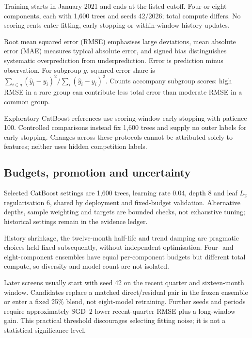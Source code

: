 \documentclass[conference]{IEEEtran}
\begin{document}
\begin{table}[!t]
\caption{Fixed-budget development RMSE (SGD); overlapping windows.}
\label{tab:temporal}\centering\small
\par\smallskip\raggedright\footnotesize Training starts in January 2021 and ends at the listed cutoff. Four or eight components, each with 1,600 trees and seeds 42/2026; total compute differs. No scoring rents enter fitting, early stopping or within-window history updates.
\end{table}

Root mean squared error (RMSE) emphasises large deviations, mean absolute error (MAE) measures typical absolute error, and signed bias distinguishes systematic overprediction from underprediction. Error is prediction minus observation. For subgroup $g$, squared-error share is $\sum_{i\in g}(\widehat y_i-y_i)^2/\sum_i(\widehat y_i-y_i)^2$. Counts accompany subgroup scores: high RMSE in a rare group can contribute less total error than moderate RMSE in a common group.

Exploratory CatBoost references use scoring-window early stopping with patience 100. Controlled comparisons instead fix 1,600 trees and supply no outer labels for early stopping. Changes across these protocols cannot be attributed solely to features; neither uses hidden competition labels.

\subsection{Budgets, promotion and uncertainty}
Selected CatBoost settings are 1,600 trees, learning rate 0.04, depth 8 and leaf $L_2$ regularisation 6, shared by deployment and fixed-budget validation. Alternative depths, sample weighting and targets are bounded checks, not exhaustive tuning; historical settings remain in the evidence ledger.

History shrinkage, the twelve-month half-life and trend damping are pragmatic choices held fixed subsequently, without independent optimisation. Four- and eight-component ensembles have equal per-component budgets but different total compute, so diversity and model count are not isolated.

Later screens usually start with seed 42 on the recent quarter and sixteen-month window. Candidates replace a matched direct/residual pair in the frozen ensemble or enter a fixed 25\% blend, not eight-model retraining. Further seeds and periods require approximately SGD~2 lower recent-quarter RMSE plus a long-window gain. This practical threshold discourages selecting fitting noise; it is not a statistical significance level.
\end{document}
